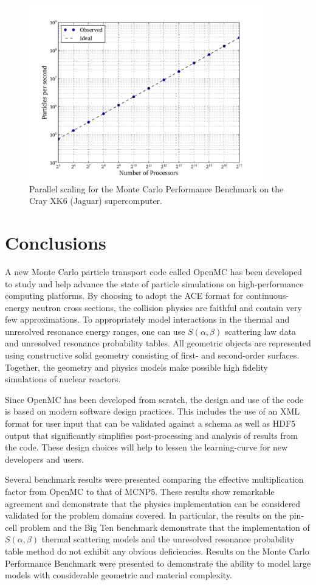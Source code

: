 \documentclass[authoryear,preprint]{elsarticle}
\begin{document}
\begin{figure}[!ht]
  \centering
  \includegraphics[width=4in]{scaling_loglog.pdf}
  \caption{Parallel scaling for the Monte Carlo Performance Benchmark on the
    Cray XK6 (Jaguar) supercomputer.}
  \label{fig:scaling}
\end{figure}

\section{Conclusions}

A new Monte Carlo particle transport code called OpenMC has been developed to
study and help advance the state of particle simulations on high-performance
computing platforms. By choosing to adopt the ACE format for continuous-energy
neutron cross sections, the collision physics are faithful and contain very few
approximations. To appropriately model interactions in the thermal and
unresolved resonance energy ranges, one can use $S(\alpha,\beta)$ scattering law
data and unresolved resonance probability tables. All geometric objects are
represented using constructive solid geometry consisting of first- and
second-order surfaces. Together, the geometry and physics models make possible
high fidelity simulations of nuclear reactors.

Since OpenMC has been developed from scratch, the design and use of the code is
based on modern software design practices. This includes the use of an XML
format for user input that can be validated against a schema as well as HDF5
output that significantly simplifies post-processing and analysis of results
from the code. These design choices will help to lessen the learning-curve for
new developers and users.

Several benchmark results were presented comparing the effective multiplication
factor from OpenMC to that of MCNP5. These results show remarkable agreement and
demonstrate that the physics implementation can be considered validated for the
problem domains covered. In particular, the results on the pin-cell problem
\citep{pincell} and the Big Ten benchmark \citep{icsbep} demonstrate that the
implementation of $S(\alpha,\beta)$ thermal scattering models and the unresolved
resonance probability table method do not exhibit any obvious
deficiencies. Results on the Monte Carlo Performance Benchmark
\citep{hoogenboom} were presented to demonstrate the ability to model large
models with considerable geometric and material complexity.
\end{document}
